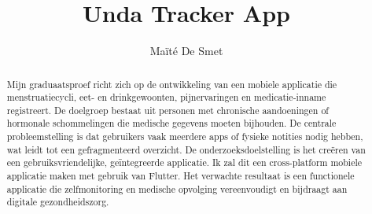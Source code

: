 \documentclass{hogent-article}
\title{Unda Tracker App}
\author{Maïté De Smet}
\begin{document}
\begin{abstract}
  Mijn graduaatsproef richt zich op de ontwikkeling van een mobiele applicatie die menstruatiecycli, eet- en drinkgewoonten, pijnervaringen en medicatie-inname registreert. De doelgroep bestaat uit personen met chronische aandoeningen of hormonale schommelingen die medische gegevens moeten bijhouden. De centrale probleemstelling is dat gebruikers vaak meerdere apps of fysieke notities nodig hebben, wat leidt tot een gefragmenteerd overzicht. De onderzoeksdoelstelling is het creëren van een gebruiksvriendelijke, geïntegreerde applicatie. Ik zal dit een cross-platform mobiele applicatie maken met gebruik van Flutter. Het verwachte resultaat is een functionele applicatie die zelfmonitoring en medische opvolging vereenvoudigt en bijdraagt aan digitale gezondheidszorg.
\end{abstract}

\tableofcontents



\printbibliography[heading=bibintoc]
\end{document}

